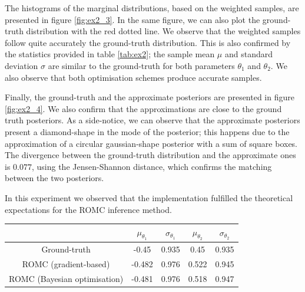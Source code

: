 The histograms of the marginal distributions, based on the weighted
samples, are presented in figure \ref{fig:ex2_3}. In the same figure,
we can also plot the ground-truth distribution with the red dotted
line. We observe that the weighted samples follow quite accurately the
ground-truth distribution. This is also confirmed by the statistics
provided in table \ref{tab:ex2}; the sample mean $\mu$ and standard
deviation $\sigma$ are similar to the ground-truth for both parameters
$\theta_1$ and $\theta_2$. We also observe that both optimisation
schemes produce accurate samples.

Finally, the ground-truth and the approximate posteriors are presented
in figure \ref{fig:ex2_4}. We also confirm that the approximations are
close to the ground truth posteriors. As a side-notice, we can observe
that the approximate posteriors present a diamond-shape in the mode of
the posterior; this happens due to the approximation of a circular
gaussian-shape posterior with a sum of square boxes. The divergence
between the ground-truth distribution and the approximate ones is
$0.077$, using the Jensen-Shannon distance, which confirms the
matching between the two posteriors.

In this experiment we observed that the implementation fulfilled the
theoretical expectations for the ROMC inference method.

\begin{center} \label{tab:ex2}
\begin{tabular}{ c|c|c|c|c }
\hline
& $\mu_{\theta_1}$ & $\sigma_{\theta_1}$ & $\mu_{\theta_2}$ & $\sigma_{\theta_2}$ \\
\hline \hline
Ground-truth & -0.45 & 0.935 & 0.45 & 0.935 \\
\hline
ROMC (gradient-based) & -0.482 & 0.976 & 0.522 & 0.945 \\
\hline
ROMC (Bayesian optimisation) & -0.481 & 0.976 & 0.518 & 0.947 \\
\hline
\end{tabular}
\end{center}


